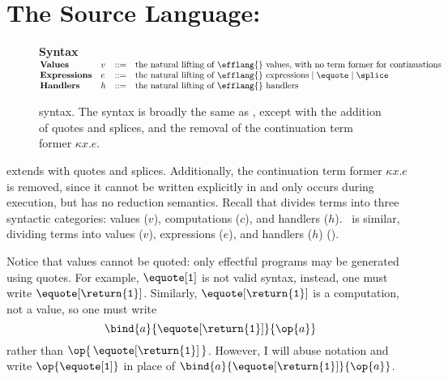 \section{The Source Language: \texorpdfstring{\sourceLang{}}{Lambda-Op-Quote-Splice}}\label{section:source-lang}
\begin{figure}
\begin{source-desc}
  {\large \textbf{Syntax}} \\

  $\begin{array}{@{}llll}
    \textbf{Values} & v & ::= & \text{the natural lifting of \efflang{} values, with no term former for continuations}\\
    \textbf{Expressions} & e & ::= & \text{the natural lifting of \efflang{} expressions} \mid \equote \mid \splice \\
    \textbf{Handlers} & h & ::= & \text{the natural lifting of \efflang{} handlers}
  \end{array}$
\end{source-desc}
\caption{\sourceLang{} syntax. The syntax is broadly the same as \efflang{}, except with the addition of quotes and splices, and the removal of the continuation term former $\kappa x.e$.}
\label{fig:source-syntax}
\end{figure}
\sourceLang{} extends \efflang{} with quotes and splices. Additionally, the continuation term former $\kappa x. e$ is removed, since it cannot be written explicitly in \efflang{} and only occurs during execution, but \sourceLang{} has no reduction semantics. Recall that \efflang{} divides terms into three syntactic categories: values ($v$), computations ($c$), and handlers ($h$).\ \sourceLang{} is similar, dividing terms into values ($v$), expressions ($e$), and handlers ($h$) ().

Notice that values cannot be quoted: only effectful programs may be generated using quotes. For example, $\equote[\texttt{1}]$ is not valid syntax, instead, one must write $\equote[\return{\texttt{1}}]$. Similarly, $\equote[\return{\texttt{1}}]$ is a computation, not a value, so one must write 
\[\bind{a}{\equote[\return{\texttt{1}}]}{\op{a}}\]
rather than $\op{\, \equote[\return{\texttt{1}}] \,}$. However, I will abuse notation and write $\op{\equote[\texttt{1}]}$ in place of $\bind{a}{\equote[\return{\texttt{1}}]}{\op{a}}$.

